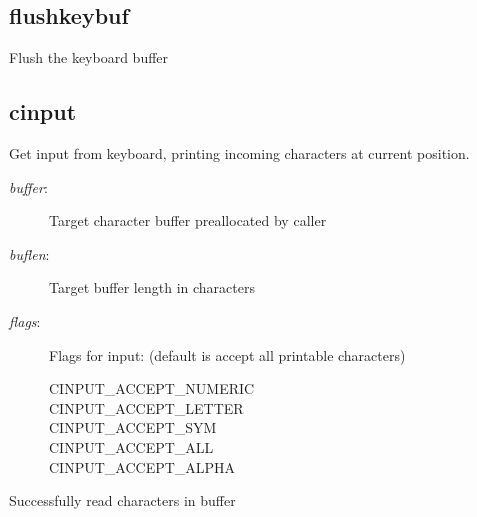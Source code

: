 \subsection{flushkeybuf}
\begin{description}[leftmargin=2cm,style=nextline]
\item [Description:] {Flush the keyboard buffer}
\item [Syntax:] 
\end{description}

\subsection{cinput}
\begin{description}[leftmargin=2cm,style=nextline]
\item [Description:] {Get input from keyboard, printing incoming characters at current position.}
\item [Syntax:] 
\item [Parameters:]
\begin{description}\item[]
\item [{\em buffer}:] {Target character buffer preallocated by caller}
\item [{\em buflen}:] {Target buffer length in characters}
\item [{\em flags}:] {Flags for input:  (default is accept all printable characters)

            CINPUT\_ACCEPT\_NUMERIC\\
            CINPUT\_ACCEPT\_LETTER\\
            CINPUT\_ACCEPT\_SYM\\
            CINPUT\_ACCEPT\_ALL\\
            CINPUT\_ACCEPT\_ALPHA\\
  }
\end{description}
\item [Desription:] {Successfully read characters in buffer}
\end{description}
